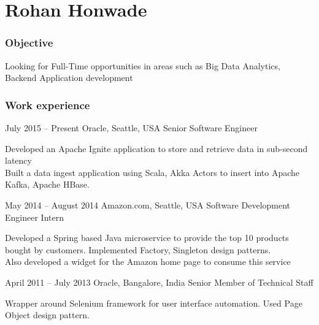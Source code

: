 \documentclass{tccv}
\begin{document}
\part{Rohan Honwade}


\section{Objective}
Looking for Full-Time opportunities in areas such as 
Big Data Analytics, Backend Application development

\section{Work experience}
\begin{eventlist}
\item{July 2015 -- Present}
     {Oracle, Seattle, USA}
     {Senior Software Engineer}
     
Developed an Apache Ignite application to store and retrieve data in sub-second latency\\

Built a data ingest application using Scala, Akka Actors to insert into Apache Kafka, Apache HBase.\\
 

\item{May 2014 -- August 2014}
     {Amazon.com, Seattle, USA}
     {Software Development Engineer Intern}

Developed a Spring based Java microservice to provide the top 10 products bought by customers. Implemented Factory, Singleton design patterns.\\

Also developed a widget for the Amazon home page to consume this service


\item{April 2011 -- July 2013}
     {Oracle, Bangalore, India}
     {Senior Member of Technical Staff}

Wrapper around Selenium framework for user interface automation. Used Page Object design pattern.\\
\\


\end{eventlist}
\end{document}
